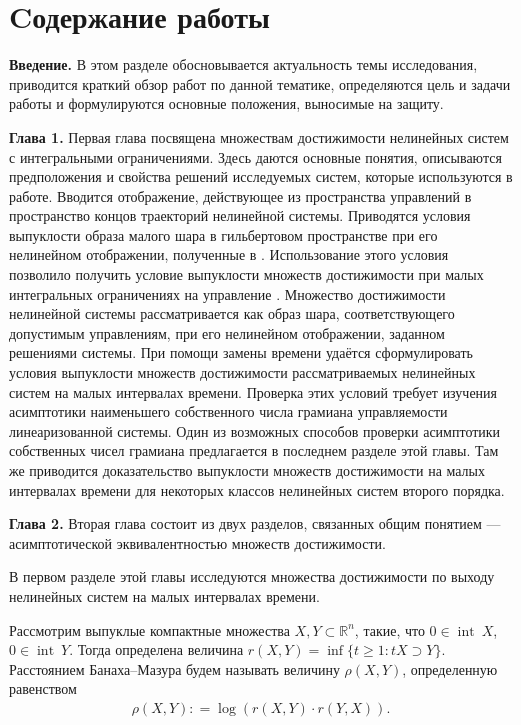 \documentclass[../abstract.tex]{subfiles}
\begin{document}
\newpage
\section*{Cодержание работы}
\textbf{Введение.} 
В этом разделе обосновывается актуальность темы исследования, приводится краткий обзор работ по данной тематике, определяются цель и задачи работы и формулируются основные положения, выносимые на защиту.


\textbf{Глава 1.}
Первая глава посвящена множествам достижимости нелинейных систем с интегральными ограничениями.  
Здесь даются основные понятия, описываются предположения и свойства решений исследуемых систем, которые используются в работе. 
Вводится отображение, действующее из пространства управлений в пространство концов траекторий нелинейной системы. 
Приводятся условия выпуклости образа малого шара в гильбертовом пространстве при его нелинейном отображении, полученные в \cite{Polyak2001}. 
Использование этого условия позволило получить условие выпуклости множеств достижимости при малых интегральных ограничениях на управление \cite{Polyak2004}.
Множество достижимости нелинейной системы рассматривается как образ шара, соответствующего допустимым управлениям, при его нелинейном отображении, заданном решениями системы.
При помощи замены времени удаётся сформулировать условия выпуклости множеств достижимости рассматриваемых нелинейных систем на малых интервалах времени. 
Проверка этих условий требует изучения асимптотики наименьшего собственного числа грамиана управляемости линеаризованной системы.
Один из возможных способов проверки асимптотики собственных чисел грамиана предлагается в последнем разделе этой главы. 
Там же приводится доказательство выпуклости множеств достижимости на малых интервалах времени для некоторых классов нелинейных систем второго порядка. 

\textbf{Глава 2.}
Вторая глава состоит из двух разделов, связанных общим понятием --- асимптотической эквивалентностью множеств достижимости. 

В первом разделе этой главы исследуются множества достижимости по выходу нелинейных систем на малых интервалах времени.

Рассмотрим выпуклые компактные множества $ X,Y \subset \mathbb R^n $, такие, что $0 \in \operatorname{int}\ X$, $0 \in \operatorname{int}\ Y$. 
Тогда определена величина $r(X, Y) = \inf \{t \geqslant 1: tX \supset Y \}$. 
Расстоянием Банаха--Мазура будем называть величину $ \rho (X, Y) $, определенную равенством 
\begin{gather*}
	\rho (X, Y): = \log (r(X,Y) \cdot r(Y, X)).
\end{gather*}
\end{document}
